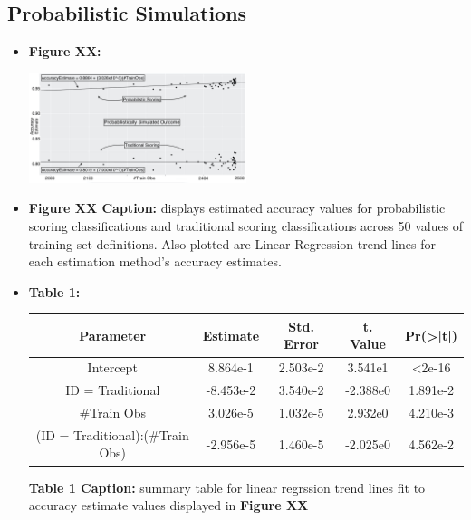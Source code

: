 \documentclass[12pt,]{article}
\begin{document}
\hypertarget{probabilistic-simulations}{%
\subsection{Probabilistic Simulations}\label{probabilistic-simulations}}

\begin{itemize}
\item
  \textbf{Figure XX:}

  \begin{center}
  \includegraphics[width=0.5\textwidth]{Sup2Graph.jpg}
  \end{center}
\item
  \textbf{Figure XX Caption:} displays estimated accuracy values for
  probabilistic scoring classifications and traditional scoring
  classifications across 50 values of training set definitions. Also
  plotted are Linear Regression trend lines for each estimation method's
  accuracy estimates.
\item
  \textbf{Table 1:}

  \begin{center}
  \begin{tabular}{|c|c|c|c|c|}
  \hline
  Parameter                      & Estimate  & Std. Error & t. Value  & Pr(>|t|) \\
  \hline
  \hline
  Intercept                      &  8.864e-1 &  2.503e-2  &  3.541e1  & <2e-16   \\                             
  \hline
  ID = Traditional               & -8.453e-2 &  3.540e-2  & -2.388e0  & 1.891e-2 \\
  \hline
  \#Train Obs                    &  3.026e-5 &  1.032e-5  &  2.932e0  & 4.210e-3 \\
  \hline
  (ID = Traditional):(\#Train Obs) &  -2.956e-5 &  1.460e-5  &  -2.025e0 & 4.562e-2 \\
  \hline
  \end{tabular}
  \end{center}

  \textbf{Table 1 Caption:} summary table for linear regrssion trend
  lines fit to accuracy estimate values displayed in \textbf{Figure XX}
\end{itemize}
\end{document}
